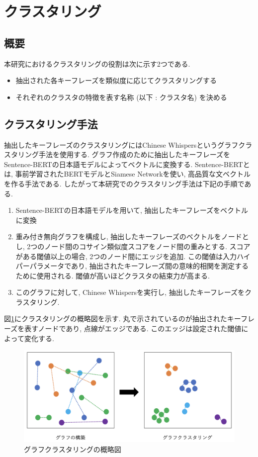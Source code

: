 
\section{クラスタリング}
\subsection{概要}
本研究におけるクラスタリングの役割は次に示す2つである. 
\begin{itemize}
  \item 抽出された各キーフレーズを類似度に応じてクラスタリングする
  \item それぞれのクラスタの特徴を表す名称 (以下 : クラスタ名) を決める
\end{itemize}

\subsection{クラスタリング手法}\label{graph_clustering}
抽出したキーフレーズのクラスタリングにはChinese Whispers\cite{chinese-whispers}というグラフクラスタリング手法を使用する. グラフ作成のために抽出したキーフレーズをSentence-BERTの日本語モデルによってベクトルに変換する. Sentence-BERT\cite{sentence-bert}とは, 事前学習されたBERTモデルとSiamese Networkを使い, 高品質な文ベクトルを作る手法である. 
したがって本研究でのクラスタリング手法は下記の手順である. 
\begin{enumerate}
  \item Sentence-BERTの日本語モデルを用いて, 抽出したキーフレーズをベクトルに変換
  \item 重み付き無向グラフを構成し, 抽出したキーフレーズのベクトルをノードとし, 2つのノード間のコサイン類似度スコアをノード間の重みとする. スコアがある閾値以上の場合, 2つのノード間にエッジを追加. この閾値は入力ハイパーパラメータであり, 抽出されたキーフレーズ間の意味的相関を測定するために使用される. 閾値が高いほどクラスタの結束力が高まる. 
  \item このグラフに対して, Chinese Whispersを実行し, 抽出したキーフレーズをクラスタリング. 
\end{enumerate}

図\ref{fig:clustering}にクラスタリングの概略図を示す. 丸で示されているのが抽出されたキーフレーズを表すノードであり, 点線がエッジである. このエッジは設定された閾値によって変化する. 
\begin{figure}[H]
  \centering
  \includegraphics[scale=0.4]
       {contents/images/clustering.png}
  \caption{グラフクラスタリングの概略図\label{fig:clustering}}
\end{figure}

